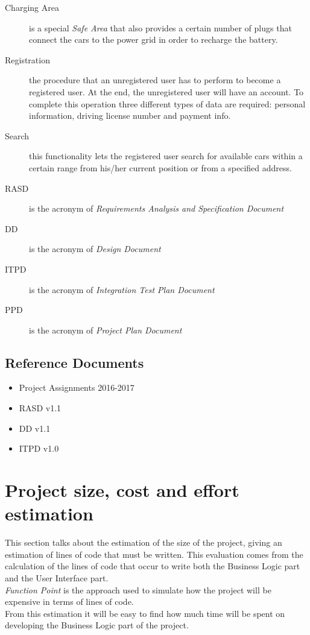 \documentclass[11pt,a4paper]{report}
\begin{document}
\begin{description}
	\item[Charging Area] is a special \textit{Safe Area} that also provides a certain number of plugs that connect the cars to the power grid in order to recharge the battery.
	\item[Registration] the procedure that an unregistered user has to perform to become a registered user. At the end, the unregistered user will have an account. To complete this operation three different types of data are required: personal information, driving license number and payment info.
	\item[Search] this functionality lets the registered user search for available cars within a certain range from his/her current position or from a specified address.
	\item[RASD] is the acronym of \textit{Requirements Analysis and Specification Document}
	\item[DD] is the acronym of \textit{Design Document}
	\item[ITPD] is the acronym of \textit{Integration Test Plan Document}
	\item[PPD] is the acronym of \textit{Project Plan Document}
\end{description}
\section{Reference Documents}
	\begin{itemize}
	\item Project Assignments 2016-2017
	\item RASD v1.1
	\item DD v1.1
	\item ITPD v1.0
\end{itemize}
\chapter{Project size, cost and effort estimation}
This section talks about the estimation of the size of the project, giving an estimation of lines of code that must be written.
This evaluation comes from the calculation of the lines of code that occur to write both the Business Logic part and the User Interface part.\\
\textit{Function Point} is the approach used to simulate how the project will be expensive in terms of lines of code.\\
From this estimation it will be easy to find how much time will be spent on developing the Business Logic part of the project.
\end{document}
